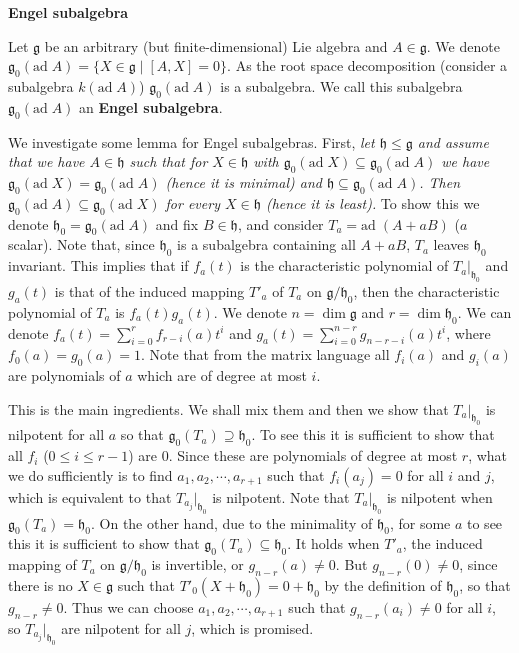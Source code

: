 \documentclass{article}
\newcommand{\SBar}{\;|\;}
\newcommand{\lie}[1]{\mathfrak{#1}}
\newcommand{\ad}[1]{\mathrm{ad}\; #1}
\begin{document}
\newpage

\textbf{Engel subalgebra}

Let $\lie{g}$ be an arbitrary (but finite-dimensional) Lie algebra and $A \in \lie{g}$.
We denote $\lie{g}_0(\ad{A}) = \{X \in \lie{g} \SBar [A, X] = 0\}$.
As the root space decomposition (consider a subalgebra $k(\ad{A})$) $\lie{g}_0(\ad{A})$ is a subalgebra.
We call this subalgebra $\lie{g}_0(\ad{A})$ an \textbf{Engel subalgebra}.

We investigate some lemma for Engel subalgebras.
First, \textit{let $\lie{h} \le \lie{g}$ and assume that we have $A \in \lie{h}$ such that for $X \in \lie{h}$ with $\lie{g}_0(\ad{X}) \subseteq \lie{g}_0(\ad{A})$ we have $\lie{g}_0(\ad{X}) = \lie{g}_0(\ad{A})$ (hence it is minimal) and $\lie{h} \subseteq \lie{g}_0(\ad{A})$.
Then $\lie{g}_0(\ad{A}) \subseteq \lie{g}_0(\ad{X})$ for every $X \in \lie{h}$ (hence it is least).}
To show this we denote $\lie{h}_0 = \lie{g}_0(\ad{A})$ and fix $B \in \lie{h}$, and consider $T_a = \ad{(A + aB)}$ ($a$ scalar).
Note that, since $\lie{h}_0$ is a subalgebra containing all $A + aB$, $T_a$ leaves $\lie{h}_0$ invariant.
This implies that if $f_a(t)$ is the characteristic polynomial of $T_a|_{\lie{h}_0}$ and $g_a(t)$ is that of the induced mapping $T'_a$ of $T_a$ on $\lie{g}/\lie{h}_0$, then the characteristic polynomial of $T_a$ is $f_a(t) g_a(t)$.
We denote $n = \dim{\lie{g}}$ and $r = \dim{\lie{h}}_0$.
We can denote $f_a(t) = \sum_{i = 0}^r f_{r - i}(a) t^i$ and $g_a(t) = \sum_{i = 0}^{n - r} g_{n - r - i}(a) t^i$, where $f_0(a) = g_0(a) = 1$.
Note that from the matrix language all $f_i(a)$ and $g_i(a)$ are polynomials of $a$ which are of degree at most $i$.

This is the main ingredients.
We shall mix them and then we show that $T_a|_{\lie{h}_0}$ is nilpotent for all $a$ so that $\lie{g}_0(T_a) \supseteq \lie{h}_0$.
To see this it is sufficient to show that all $f_i$ ($0 \le i \le r - 1$) are 0.
Since these are polynomials of degree at most $r$, what we do sufficiently is to find $a_1, a_2, \cdots, a_{r + 1}$ such that $f_i(a_j) = 0$ for all $i$ and $j$, which is equivalent to that $T_{a_j}|_{\lie{h}_0}$ is nilpotent.
Note that $T_a|_{\lie{h}_0}$ is nilpotent when $\lie{g}_0(T_a) = \lie{h}_0$.
On the other hand, due to the minimality of $\lie{h}_0$, for some $a$ to see this it is sufficient to show that $\lie{g}_0(T_a) \subseteq \lie{h}_0$.
It holds when $T'_a$, the induced mapping of $T_a$ on $\lie{g}/\lie{h}_0$ is invertible, or $g_{n - r}(a) \ne 0$.
But $g_{n - r}(0) \ne 0$, since there is no $X \in \lie{g}$ such that $T'_0(X + \lie{h}_0) = 0 + \lie{h}_0$ by the definition of $\lie{h}_0$, so that $g_{n - r} \ne 0$.
Thus we can choose $a_1, a_2, \cdots, a_{r + 1}$ such that $g_{n - r}(a_i) \ne 0$ for all $i$, so $T_{a_j}|_{\lie{h}_0}$ are nilpotent for all $j$, which is promised.
\end{document}
